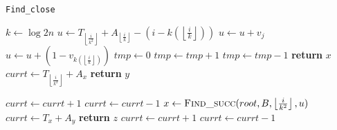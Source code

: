 \documentclass{article}
\begin{document}
    \begin{algorithm}
    \caption{\texttt{Find\_close}}\label{findclose}
    \begin{algorithmic}[1]
        \State $k\gets\log{2n}$
        \State $u\gets T_{\left\lfloor{\frac{i}{k^2}}\right\rfloor}+A_{\left\lfloor{\frac{i}{k}}\right\rfloor}-(i-k(\left\lfloor{\frac{i}{k}}\right\rfloor))$
            \State $u\gets u+v_j$
        \EndFor
        \State $u\gets u+(1-v_{k(\left\lfloor{\frac{i}{k}}\right\rfloor)})$
        \State
        \State $tmp\gets 0$
                \State $tmp\gets tmp+1$
            \Else  
                \State $tmp\gets tmp-1$
            \EndIf
                \State \textbf{return} $x$
            \EndIf
        \EndFor
        \State
                \State $currt\gets T_{\left\lfloor{\frac{i}{k^2}}\right\rfloor}+A_x$
                        \State \textbf{return} $y$
                    \EndIf
    \end{algorithmic}
    \end{algorithm}
    \begin{algorithm}
    \begin{algorithmic}[1]
                        \State $currt\gets currt+1$
                    \EndIf
                        \State $currt\gets currt-1$
                    \EndIf
                \EndFor
            \EndIf
        \EndFor
        \State
        \State $x\gets \Call{Find\_succ}{root,B,\left\lfloor{\frac{i}{k^2}}\right\rfloor,u}$ 
                \State $currt\gets T_x+A_y$
                        \State \textbf{return} $z$
                    \EndIf
                        \State $currt\gets currt+1$
                    \EndIf
                        \State $currt\gets currt-1$
                    \EndIf
                \EndFor
            \EndIf
        \EndFor
    \EndProcedure
    \end{algorithmic}
    \end{algorithm}
    
\end{document}
